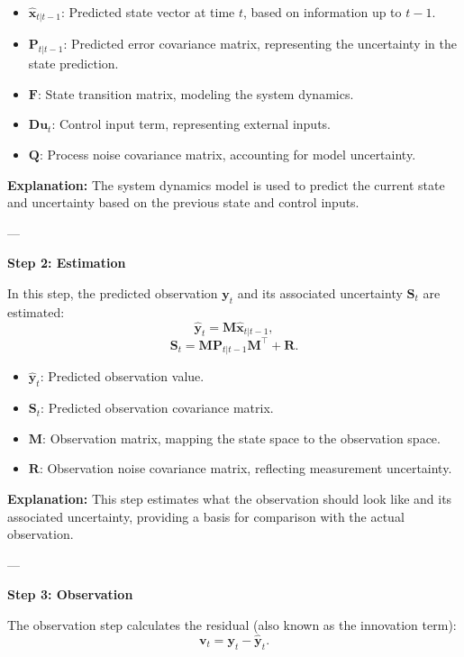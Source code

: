\documentclass[12pt,a4paper]{article}
\begin{document}
\begin{itemize}
    \item \( \hat{\mathbf{x}}_{t|t-1} \): Predicted state vector at time \( t \), based on information up to \( t-1 \).
    \item \( \mathbf{P}_{t|t-1} \): Predicted error covariance matrix, representing the uncertainty in the state prediction.
    \item \( \mathbf{F} \): State transition matrix, modeling the system dynamics.
    \item \( \mathbf{D}\mathbf{u}_t \): Control input term, representing external inputs.
    \item \( \mathbf{Q} \): Process noise covariance matrix, accounting for model uncertainty.
\end{itemize}

\textbf{Explanation:} The system dynamics model is used to predict the current state and uncertainty based on the previous state and control inputs.

---

\textbf{Step 2: Estimation}

In this step, the predicted observation \( \mathbf{y}_t \) and its associated uncertainty \( \mathbf{S}_t \) are estimated:
\[
\hat{\mathbf{y}}_t = \mathbf{M}\hat{\mathbf{x}}_{t|t-1},
\]
\[
\mathbf{S}_t = \mathbf{M}\mathbf{P}_{t|t-1}\mathbf{M}^\top + \mathbf{R}.
\]

\begin{itemize}
    \item \( \hat{\mathbf{y}}_t \): Predicted observation value.
    \item \( \mathbf{S}_t \): Predicted observation covariance matrix.
    \item \( \mathbf{M} \): Observation matrix, mapping the state space to the observation space.
    \item \( \mathbf{R} \): Observation noise covariance matrix, reflecting measurement uncertainty.
\end{itemize}

\textbf{Explanation:} This step estimates what the observation should look like and its associated uncertainty, providing a basis for comparison with the actual observation.

---

\textbf{Step 3: Observation}

The observation step calculates the residual (also known as the innovation term):
\[
\mathbf{v}_t = \mathbf{y}_t - \hat{\mathbf{y}}_t.
\]
\end{document}
